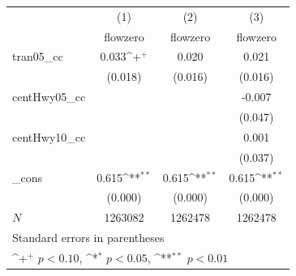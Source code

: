 {
\def\sym#1{\ifmmode^{#1}\else\(^{#1}\)\fi}
\begin{tabular}{l*{3}{c}}
\hline\hline
            &\multicolumn{1}{c}{(1)}&\multicolumn{1}{c}{(2)}&\multicolumn{1}{c}{(3)}\\
            &\multicolumn{1}{c}{flowzero}&\multicolumn{1}{c}{flowzero}&\multicolumn{1}{c}{flowzero}\\
\hline
tran05\_cc   &       0.033\sym{+} &       0.020        &       0.021        \\
            &     (0.018)        &     (0.016)        &     (0.016)        \\
[1em]
centHwy05\_cc&                    &                    &      -0.007        \\
            &                    &                    &     (0.047)        \\
[1em]
centHwy10\_cc&                    &                    &       0.001        \\
            &                    &                    &     (0.037)        \\
[1em]
\_cons      &       0.615\sym{**}&       0.615\sym{**}&       0.615\sym{**}\\
            &     (0.000)        &     (0.000)        &     (0.000)        \\
\hline
\(N\)       &     1263082        &     1262478        &     1262478        \\
\hline\hline
\multicolumn{4}{l}{\footnotesize Standard errors in parentheses}\\
\multicolumn{4}{l}{\footnotesize \sym{+} \(p<0.10\), \sym{*} \(p<0.05\), \sym{**} \(p<0.01\)}\\
\end{tabular}
}
